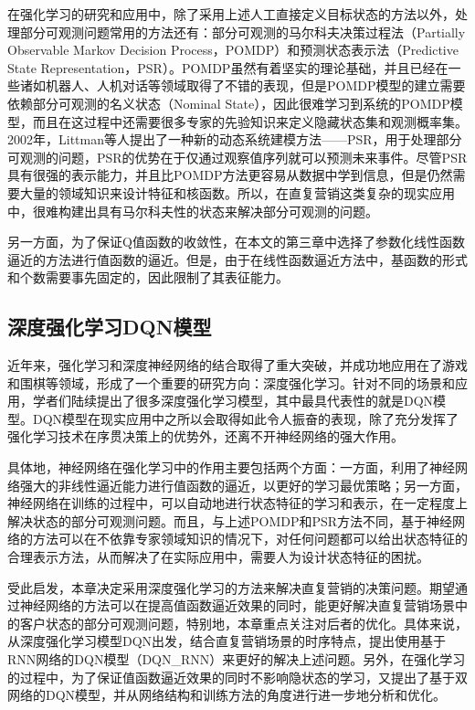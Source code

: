 在强化学习的研究和应用中，除了采用上述人工直接定义目标状态的方法以外，处理部分可观测问题常用的方法还有：部分可观测的马尔科夫决策过程法（Partially Observable Markov  Decision Process，POMDP）\citep{kaelbling1998planning}和预测状态表示法（Predictive State Representation，PSR）\citep{littman2002predictive}。POMDP虽然有着坚实的理论基础，并且已经在一些诸如机器人、人机对话等领域取得了不错的表现\citep{pineau2003point,williams2007partially}，但是POMDP模型的建立需要依赖部分可观测的名义状态（Nominal State），因此很难学习到系统的POMDP模型，而且在这过程中还需要很多专家的先验知识来定义隐藏状态集和观测概率集。2002年，Littman等人提出了一种新的动态系统建模方法——PSR\citep{littman2002predictive}，用于处理部分可观测的问题，PSR的优势在于仅通过观察值序列就可以预测未来事件。尽管PSR具有很强的表示能力，并且比POMDP方法更容易从数据中学到信息，但是仍然需要大量的领域知识来设计特征和核函数。所以，在直复营销这类复杂的现实应用中，很难构建出具有马尔科夫性的状态来解决部分可观测的问题。

另一方面，为了保证Q值函数的收敛性，在本文的第三章中选择了参数化线性函数逼近的方法进行值函数的逼近。但是，由于在线性函数逼近方法中，基函数的形式和个数需要事先固定的，因此限制了其表征能力。

\subsection{深度强化学习DQN模型}
近年来，强化学习和深度神经网络的结合取得了重大突破，并成功地应用在了游戏和围棋等领域\citep{mnih2013playing}，形成了一个重要的研究方向：深度强化学习。针对不同的场景和应用，学者们陆续提出了很多深度强化学习模型\citep{van2016deep,mnih2016asynchronous,lillicrap2015continuous}，其中最具代表性的就是DQN模型\citep{mnih2015human}。DQN模型在现实应用中之所以会取得如此令人振奋的表现，除了充分发挥了强化学习技术在序贯决策上的优势外，还离不开神经网络的强大作用。

具体地，神经网络在强化学习中的作用主要包括两个方面：一方面，利用了神经网络强大的非线性逼近能力进行值函数的逼近，以更好的学习最优策略；另一方面，神经网络在训练的过程中，可以自动地进行状态特征的学习和表示，在一定程度上解决状态的部分可观测问题。而且，与上述POMDP和PSR方法不同，基于神经网络的方法可以在不依靠专家领域知识的情况下，对任何问题都可以给出状态特征的合理表示方法\citep{deng2014deep}，从而解决了在实际应用中，需要人为设计状态特征的困扰。

受此启发，本章决定采用深度强化学习的方法来解决直复营销的决策问题。期望通过神经网络的方法可以在提高值函数逼近效果的同时，能更好解决直复营销场景中的客户状态的部分可观测问题，特别地，本章重点关注对后者的优化。具体来说，从深度强化学习模型DQN出发，结合直复营销场景的时序特点，提出使用基于RNN网络的DQN模型（DQN_RNN）来更好的解决上述问题。另外，在强化学习的过程中，为了保证值函数逼近效果的同时不影响隐状态的学习，又提出了基于双网络的DQN模型，并从网络结构和训练方法的角度进行进一步地分析和优化。

